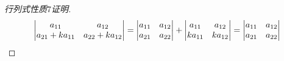 \documentclass[8pt a4paper, oneside, UTF8]{ctexbook}
\begin{document}
\begin{sloppypar}
\begin{enumerate}
\begin{proof}[行列式性质$7$证明]
$$\begin{vmatrix}
                          a_{11}         & a_{12}         \\
                          a_{21}+ka_{11} & a_{22}+ka_{12}
                      \end{vmatrix}=\begin{vmatrix}
                          a_{11} & a_{12} \\
                          a_{21} & a_{22}
                      \end{vmatrix}+\begin{vmatrix}
                          a_{11}  & a_{12}  \\
                          ka_{11} & ka_{12}
                      \end{vmatrix}=\begin{vmatrix}
                          a_{11} & a_{12} \\
                          a_{21} & a_{22}
                      \end{vmatrix}\\
                  $$
              \end{proof}
    \end{enumerate}

\end{sloppypar}
\end{document}
